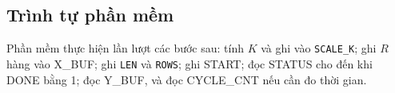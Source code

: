 \subsection{Trình tự phần mềm}

Phần mềm thực hiện lần lượt các bước sau: tính $K$ và ghi vào \texttt{SCALE\_K}; ghi $R$ hàng vào X\_BUF; ghi \texttt{LEN} và \texttt{ROWS}; ghi START; đọc STATUS cho đến khi DONE bằng 1; đọc Y\_BUF, và đọc CYCLE\_CNT nếu cần đo thời gian.
